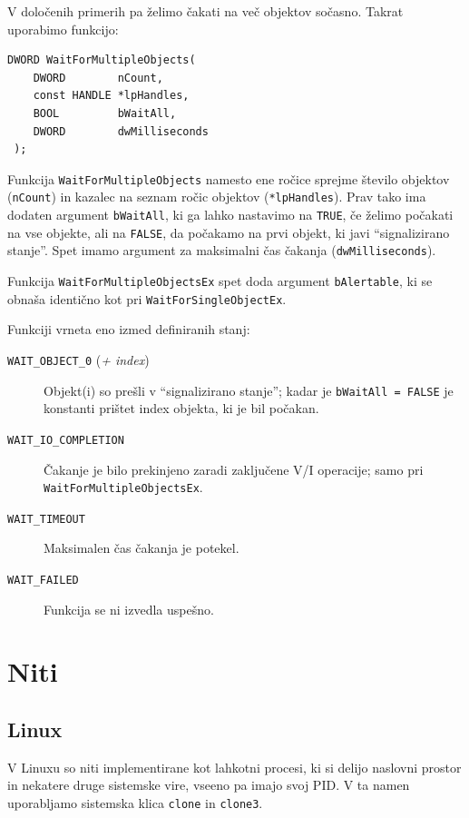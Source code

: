 \documentclass[a4paper,12pt,openright]{book}
\begin{document}
V določenih primerih pa želimo čakati na več objektov sočasno.
Takrat uporabimo funkcijo:
\begin{lstlisting}[style=func]
 DWORD WaitForMultipleObjects(
	DWORD        nCount,
	const HANDLE *lpHandles,
	BOOL         bWaitAll,
	DWORD        dwMilliseconds
 );
\end{lstlisting}

Funkcija \texttt{WaitForMultipleObjects} namesto ene ročice sprejme število objektov (\texttt{nCount}) in kazalec na seznam ročic objektov (\texttt{*lpHandles}).
Prav tako ima dodaten argument \texttt{bWaitAll}, ki ga lahko nastavimo na \texttt{TRUE}, če želimo počakati na vse objekte, ali na \texttt{FALSE}, da počakamo na prvi objekt, ki javi ``signalizirano stanje''.
Spet imamo argument za maksimalni čas čakanja (\texttt{dwMilliseconds}).

Funkcija \texttt{WaitForMultipleObjectsEx} spet doda argument \texttt{bAlertable}, ki se obnaša identično kot pri \texttt{WaitForSingleObjectEx}.

Funkciji vrneta eno izmed definiranih stanj:
\begin{description}
	\item[\texttt{WAIT\_OBJECT\_0} (\textit{+ index})] Objekt(i) so prešli v ``signalizirano stanje''; kadar je \texttt{bWaitAll = FALSE} je konstanti prištet index objekta, ki je bil počakan.
	\item[\texttt{WAIT\_IO\_COMPLETION}] Čakanje je bilo prekinjeno zaradi zaključene V/I operacije; samo pri \texttt{WaitForMultipleObjectsEx}.
	\item[\texttt{WAIT\_TIMEOUT}] Maksimalen čas čakanja je potekel.
	\item[\texttt{WAIT\_FAILED}] Funkcija se ni izvedla uspešno.
\end{description}

\section{Niti} \label{sec:threads}

\subsection{Linux} \label{ssec:linux_syscalls:threads}

V Linuxu so niti implementirane kot lahkotni procesi, ki si delijo naslovni prostor in nekatere druge sistemske vire, vseeno pa imajo svoj PID.
V ta namen uporabljamo sistemska klica \texttt{clone} in \texttt{clone3}.
\end{document}
